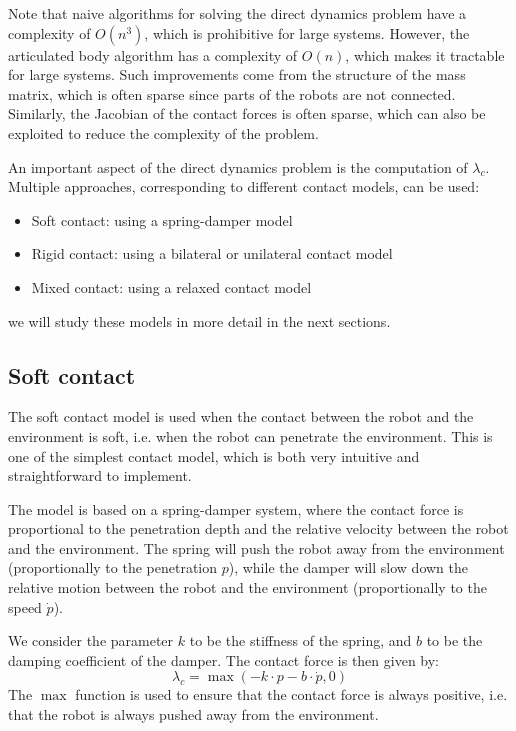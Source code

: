 Note that naive algorithms for solving the direct dynamics problem have a complexity of $O(n^3)$, which is prohibitive for large systems. However, the articulated body algorithm has a complexity of $O(n)$, which makes it tractable for large systems. Such improvements come from the structure of the mass matrix, which is often sparse since parts of the robots are not connected. Similarly, the Jacobian of the contact forces is often sparse, which can also be exploited to reduce the complexity of the problem.

An important aspect of the direct dynamics problem is the computation of $\lambda_c$. Multiple approaches, corresponding to different contact models, can be used:
\begin{itemize}
    \item Soft contact: using a spring-damper model
    \item Rigid contact: using a bilateral or unilateral contact model
    \item Mixed contact: using a relaxed contact model
\end{itemize}
we will study these models in more detail in the next sections.

\subsection{Soft contact}
The soft contact model is used when the contact between the robot and the environment is soft, i.e. when the robot can penetrate the environment. This is one of the simplest contact model, which is both very intuitive and straightforward to implement. 

The model is based on a spring-damper system, where the contact force is proportional to the penetration depth and the relative velocity between the robot and the environment. The spring will push the robot away from the environment (proportionally to the penetration $p$), while the damper will slow down the relative motion between the robot and the environment (proportionally to the speed $\dot{p}$).

We consider the parameter $k$ to be the stiffness of the spring, and $b$ to be the damping coefficient of the damper. The contact force is then given by:
\begin{equation}
    \lambda_c = \max(-k\cdot p - b\cdot\dot{p}, 0)
\end{equation}
The $\max$ function is used to ensure that the contact force is always positive, i.e. that the robot is always pushed away from the environment.

